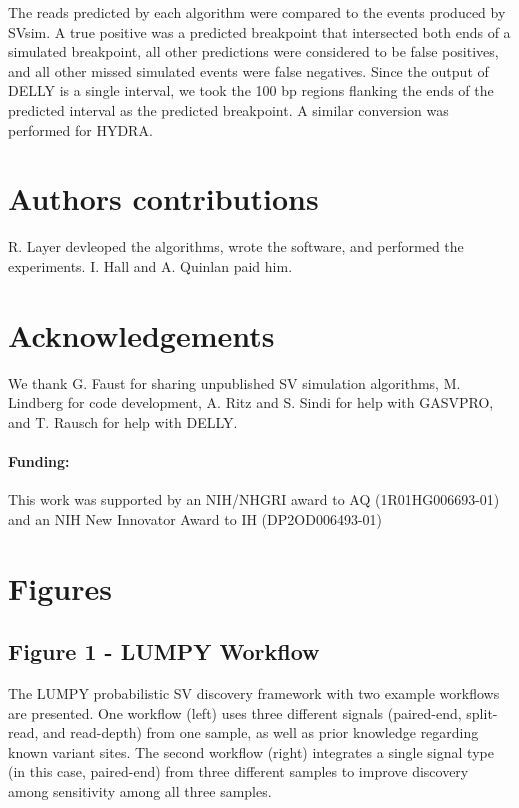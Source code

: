 \documentclass[10pt]{bmc_article}
\def\texttt{[image: ]}
\newenvironment{bmcformat}{\begin{raggedright}\baselineskip20pt\sloppy\setboolean{publ}{false}}{\end{raggedright}\baselineskip20pt\sloppy}
\begin{document}
\begin{bmcformat}
The reads predicted by each algorithm were compared to the events produced by
SVsim.  A true positive was a predicted breakpoint that intersected both ends of
a simulated breakpoint, all other predictions were considered to be false
positives, and all other missed simulated events were false negatives.  Since
the output of DELLY is a single interval, we took the 100 bp regions flanking
the ends of the predicted interval as the predicted breakpoint.  A similar
conversion was performed for HYDRA.

\section*{Authors contributions}
R. Layer devleoped the algorithms, wrote the software, and performed the
experiments.  I. Hall and A. Quinlan paid him.

\section*{Acknowledgements}
We thank G. Faust for sharing unpublished SV simulation algorithms, M. Lindberg
for code development, A. Ritz and S. Sindi for help with GASVPRO, and T. Rausch
for help with DELLY.

\paragraph{Funding:} This work was supported by an NIH/NHGRI award to
AQ (1R01HG006693-01) and an NIH New Innovator Award to IH (DP2OD006493-01)

%
%

{
   }



\section*{Figures}
\subsection*{Figure 1 - LUMPY Workflow}
The LUMPY probabilistic SV discovery framework with two example
workflows are presented. One workflow (left) uses three different signals
(paired-end, split-read, and read-depth) from one sample, as well as prior
knowledge regarding known variant sites. The second workflow (right) integrates
a single signal type (in this case, paired-end) from three different samples to
improve discovery among sensitivity among all three samples.


\end{bmcformat}
\end{document}
